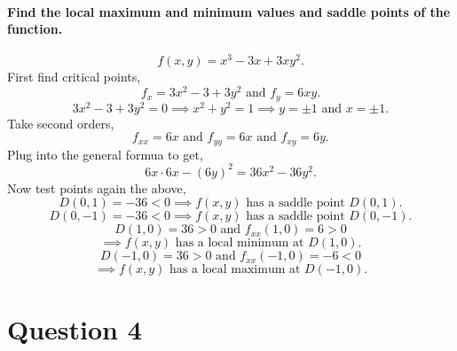 \paragraph{Find the local maximum and minimum values and saddle points of the function.}
\[
f\left( x,y \right) = x^3-3x+3xy^2
.\] 
First find critical points,
\[
f_x= 3x^2-3+3y^2\text{ and }f_y=6xy
.\] 
\[
3x^2-3+3y^2=0 \implies x^2+y^2=1 \implies y = \pm 1\text{ and }x= \pm 1
.\] 
Take second orders,
\[
f_{ xx }= 6x\text{ and }f_{ yy }=6x\text{ and }f_{ xy }=6y
.\] 
Plug into the general formua to get,
\[
6x\cdot 6x-\left( 6y \right) ^2=36x^2-36y^2
.\] 
Now test points again the above,
\[
D\left( 0,1 \right) = -36 < 0 \implies f\left( x,y \right) \text{ has a saddle point }D\left( 0,1 \right) 
.\] 
\[
D\left( 0,-1 \right) = -36 < 0 \implies f\left( x,y \right) \text{ has a saddle point }D\left( 0,-1 \right)
.\] 
\[
D\left( 1,0 \right) = 36 > 0\text{ and }f_{ xx }\left( 1,0 \right) = 6 > 0 
\] 
\[
\implies f\left( x,y \right) \text{ has a local minimum at }D\left( 1,0 \right)
.\] 
\[
D\left( -1,0 \right) = 36 > 0\text{ and }f_{ xx }\left( -1,0 \right) = -6 < 0 
\] 
\[
\implies f\left( x,y \right) \text{ has a local maximum at }D\left( -1,0 \right)
.\] 
\section{Question 4}%
\label{sec: Question 4 }
